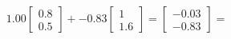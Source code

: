 \documentclass[preview]{standalone}
\begin{document}
\begin{align*}
1.00 \begin{bmatrix} 0.8 \\ 0.5 \end{bmatrix} + -0.83 \begin{bmatrix} 1 \\ 1.6 \end{bmatrix} = \begin{bmatrix} -0.03 \\ -0.83 \end{bmatrix} =
\end{align*}
\end{document}
